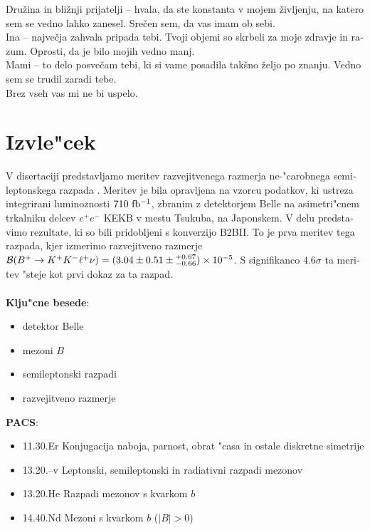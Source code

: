\begin{otherlanguage}{slovene}
\noindent Družina in bližnji prijatelji -- hvala, da ste konstanta v mojem življenju, na katero sem se vedno lahko zanesel. Srečen sem, da vas imam ob sebi.\\

\noindent Ina -- največja zahvala pripada tebi. Tvoji objemi so skrbeli za moje zdravje in razum. Oprosti, da je bilo mojih vedno manj.\\

\noindent Mami -- to delo posvečam tebi, ki si vame posadila takšno željo po znanju. Vedno sem se trudil zaradi tebe.\\

\hfill Brez vseh vas mi ne bi uspelo.


\pagestyle{empty}


\cleardoublepage
\chapter*{Izvle"cek}
V disertaciji predstavljamo meritev razvejitvenega razmerja ne-"carobnega semileptonskega razpada \decayb. Meritev je bila opravljena na vzorcu podatkov, ki ustreza integrirani luminoznosti $710\mathrm{~fb^{-1}}$, zbranim z detektorjem Belle na asimetri"cnem trkalniku delcev $e^+e^-$ KEKB v mestu Tsukuba, na Japonskem. V delu predstavimo rezultate, ki so bili pridobljeni s konverzijo B2BII. To je prva meritev tega razpada, kjer izmerimo razvejitveno razmerje $\mathcal{B}(B^+ \to K^+ K^- \ell^+ \nu) = (3.04 \pm 0.51 \pm {}^{+0.67}_{-0.66})\times 10^{-5}$. S signifikanco $4.6\sigma$ ta meritev "steje kot prvi dokaz za ta razpad.\\
\vspace{1cm}\\
{{\bf Klju"cne besede}:}
\begin{itemize}
	\item detektor Belle
	\item mezoni $B$
	\item semileptonski razpadi
	\item razvejitveno razmerje
\end{itemize}
\vspace{1cm}
{{\bf PACS}:}
\begin{itemize}
	\item 11.30.Er Konjugacija naboja, parnost, obrat "casa in ostale diskretne simetrije
	\item 13.20.--v Leptonski, semileptonski in radiativni razpadi mezonov
	\item 13.20.He Razpadi mezonov s kvarkom $b$
	\item 14.40.Nd Mezoni s kvarkom $b$ ($|B|>0$) 
\end{itemize}
\end{otherlanguage}

